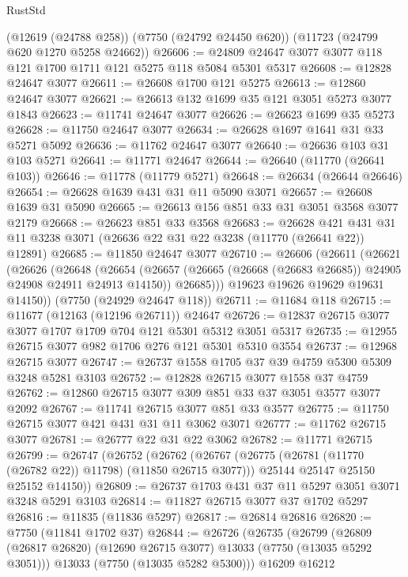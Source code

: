 \begin{lexlean}{RustStd}
\begin{coremodule}
    (@12619 (@24788 @258))
    (@7750 (@24792 @24450 @620))
    (@11723 (@24799 @620 @1270 @5258 @24662))
@26606 := @24809 @24647 @3077 @3077 @118 @121 @1700 @1711 @121 @5275 @118 @5084 @5301 @5317
@26608 := @12828 @24647 @3077
@26611 := @26608 @1700 @121 @5275
@26613 := @12860 @24647 @3077
@26621 := @26613 @132 @1699 @35 @121 @3051 @5273 @3077 @1843
@26623 := @11741 @24647 @3077
@26626 := @26623 @1699 @35 @5273
@26628 := @11750 @24647 @3077
@26634 := @26628 @1697 @1641 @31 @33 @5271 @5092
@26636 := @11762 @24647 @3077
@26640 := @26636 @103 @31 @103 @5271
@26641 := @11771 @24647
@26644 := @26640 (@11770 (@26641 @103))
@26646 := @11778 (@11779 @5271)
@26648 := @26634 (@26644 @26646)
@26654 := @26628 @1639 @431 @31 @11 @5090 @3071
@26657 := @26608 @1639 @31 @5090
@26665 := @26613 @156 @851 @33 @31 @3051 @3568 @3077 @2179
@26668 := @26623 @851 @33 @3568
@26683 := @26628
    @421
    @431
    @31
    @11
    @3238
    @3071
    (@26636 @22 @31 @22 @3238 (@11770 (@26641 @22)) @12891)
@26685 := @11850 @24647 @3077
@26710 := @26606
    (@26611
      (@26621
        (@26626
          (@26648
            (@26654
              (@26657 (@26665 (@26668 (@26683 @26685)) @24905 @24908 @24911 @24913 @14150))
              @26685)))
        @19623
        @19626
        @19629
        @19631
        @14150))
    (@7750 (@24929 @24647 @118))
@26711 := @11684 @118
@26715 := @11677 (@12163 (@12196 @26711)) @24647
@26726 := @12837 @26715 @3077 @3077 @1707 @1709 @704 @121 @5301 @5312 @3051 @5317
@26735 := @12955 @26715 @3077 @982 @1706 @276 @121 @5301 @5310 @3554
@26737 := @12968 @26715 @3077
@26747 := @26737 @1558 @1705 @37 @39 @4759 @5300 @5309 @3248 @5281 @3103
@26752 := @12828 @26715 @3077 @1558 @37 @4759
@26762 := @12860 @26715 @3077 @309 @851 @33 @37 @3051 @3577 @3077 @2092
@26767 := @11741 @26715 @3077 @851 @33 @3577
@26775 := @11750 @26715 @3077 @421 @431 @31 @11 @3062 @3071
@26777 := @11762 @26715 @3077
@26781 := @26777 @22 @31 @22 @3062
@26782 := @11771 @26715
@26799 := @26747
    (@26752
      (@26762
        (@26767 (@26775 (@26781 (@11770 (@26782 @22)) @11798) (@11850 @26715 @3077)))
        @25144
        @25147
        @25150
        @25152
        @14150))
@26809 := @26737 @1703 @431 @37 @11 @5297 @3051 @3071 @3248 @5291 @3103
@26814 := @11827 @26715 @3077 @37 @1702 @5297
@26816 := @11835 (@11836 @5297)
@26817 := @26814 @26816
@26820 := @7750 (@11841 @1702 @37)
@26844 := @26726
    (@26735
      (@26799
        (@26809 (@26817 @26820) (@12690 @26715 @3077) @13033 (@7750 (@13035 @5292 @3051)))
        @13033
        (@7750 (@13035 @5282 @5300)))
      @16209
      @16212

\end{coremodule}
\end{lexlean}
